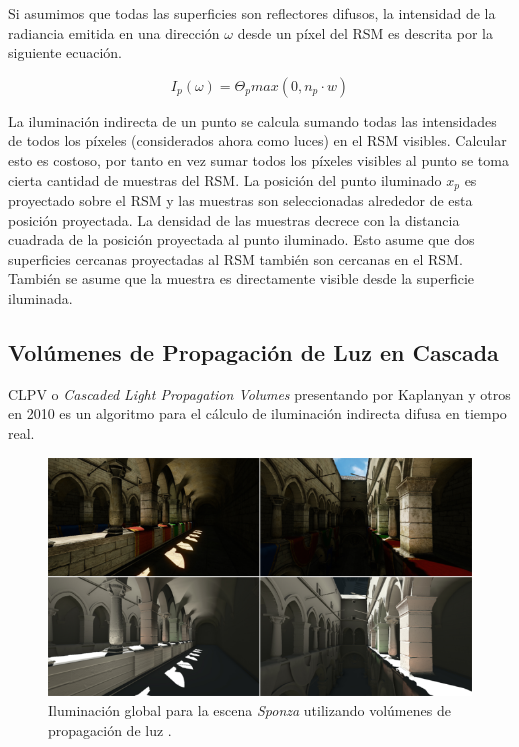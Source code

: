 Si asumimos que todas las superficies son reflectores difusos, la intensidad de la radiancia emitida en una dirección $\omega$ desde un píxel del \ac{RSM} es descrita por la siguiente ecuación.

\begin{equation}
    I_{p}(\omega) = \Theta_{p}max(0, n_{p} \cdot {w})
    \label{eq:rsm_radiance}
\end{equation}

La iluminación indirecta de un punto se calcula sumando todas las intensidades de todos los píxeles (considerados ahora como luces) en el \ac{RSM} visibles. Calcular esto es costoso, por tanto en vez sumar todos los píxeles visibles al punto se toma cierta cantidad de muestras del \ac{RSM}. La posición del punto iluminado $x_{p}$ es proyectado sobre el \ac{RSM} y las muestras son seleccionadas alrededor de esta posición proyectada. La densidad de las muestras decrece con la distancia cuadrada de la posición proyectada al punto iluminado. Esto asume que dos superficies cercanas proyectadas al \ac{RSM} también son cercanas en el \ac{RSM}. También se asume que la muestra es directamente visible desde la superficie iluminada.

\subsection{Volúmenes de Propagación de Luz en Cascada}
\label{sub:clpv}
\Ac{CLPV} o \emph{Cascaded Light Propagation Volumes} presentando por Kaplanyan y otros en 2010 \cite{Kaplanyan:2010} es un algoritmo para el cálculo de iluminación indirecta difusa en tiempo real.

\begin{figure}[H]
	\centering
	\includegraphics[width=0.85\linewidth]{media/lpvresult.png}
	\caption{Iluminación global para la escena \emph{Sponza} utilizando volúmenes de propagación de luz \cite{Kaplanyan:2010}.}
	\label{fig:lvp_results}
\end{figure}

